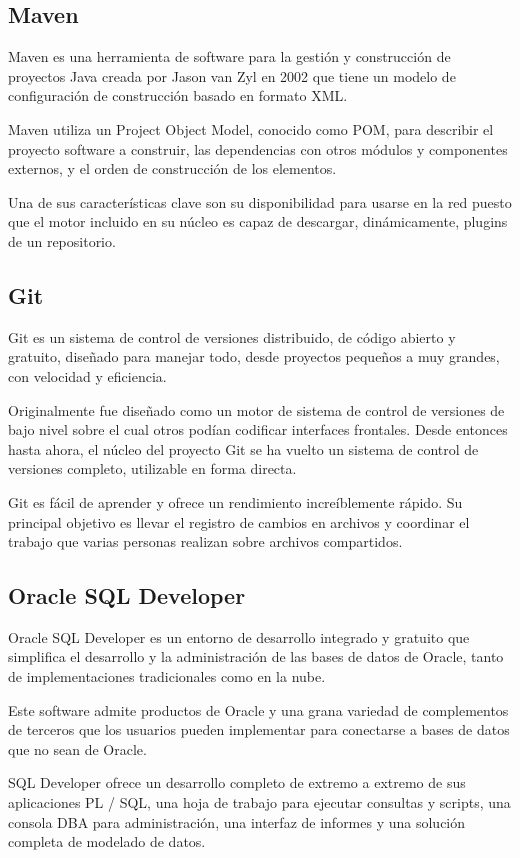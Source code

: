 \subsection{Maven}
Maven es una herramienta de software para la gestión y construcción de proyectos Java creada por Jason van Zyl en 2002 que tiene un modelo de configuración de construcción basado en formato XML.

Maven utiliza un Project Object Model, conocido como POM, para describir el proyecto software a construir, las dependencias con otros módulos y componentes externos, y el orden de construcción de los elementos.

Una de sus características clave son su disponibilidad para usarse en la red puesto que el motor incluido en su núcleo es capaz de descargar, dinámicamente, plugins de un repositorio.


\subsection{Git}
Git es un sistema de control de versiones distribuido, de código abierto y gratuito, diseñado para manejar todo, desde proyectos pequeños a muy grandes, con velocidad y eficiencia.

Originalmente fue diseñado como un motor de sistema de control de versiones de bajo nivel sobre el cual otros podían codificar interfaces frontales. Desde entonces hasta ahora, el núcleo del proyecto Git se ha vuelto un sistema de control de versiones completo, utilizable en forma directa.

Git es fácil de aprender y ofrece un rendimiento increíblemente rápido. Su principal objetivo es llevar el registro de cambios en archivos y coordinar el trabajo que varias personas realizan sobre archivos compartidos.


\subsection{Oracle SQL Developer}
Oracle SQL Developer es un entorno de desarrollo integrado y gratuito que simplifica el desarrollo y la administración de las bases de datos de Oracle, tanto de implementaciones tradicionales como en la nube.

Este software admite productos de Oracle y una grana variedad de complementos de terceros que los usuarios pueden implementar para conectarse a bases de datos que no sean de Oracle.

SQL Developer ofrece un desarrollo completo de extremo a extremo de sus aplicaciones PL / SQL, una hoja de trabajo para ejecutar consultas y scripts, una consola DBA para administración, una interfaz de informes y una solución completa de modelado de datos.



